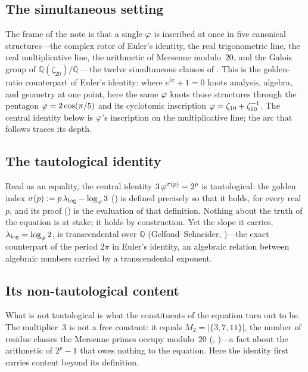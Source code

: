 \subsection*{The simultaneous setting}
The frame of the note is that a single $\varphi$ is inscribed at once in
five canonical structures---the complex rotor of Euler's identity, the real
trigonometric line, the real multiplicative line, the arithmetic of Mersenne
modulo~$20$, and the Galois group of $\mathbb{Q}(\zeta_{20})/\mathbb{Q}$%
---the twelve simultaneous clauses of .  This is
the golden-ratio counterpart of Euler's identity: where $e^{i\pi}+1=0$ knots
analysis, algebra, and geometry at one point, here the same $\varphi$ knots
those structures through the pentagon $\varphi=2\cos(\pi/5)$ and its
cyclotomic inscription $\varphi=\zeta_{10}+\zeta_{10}^{-1}$.  The central
identity below is $\varphi$'s inscription on the multiplicative line; the
arc that follows traces its depth.

\subsection*{The tautological identity}
Read as an equality, the central identity $3\,\varphi^{\sigma(p)}=2^{p}$ is
tautological: the golden index
$\sigma(p):=p\,\lambda_{\log}-\log_{\varphi}3$ () is defined
precisely so that it holds, for every real~$p$, and its proof
() is the evaluation of that definition.  Nothing about
the truth of the equation is at stake; it holds by construction.  Yet the
slope it carries, $\lambda_{\log}=\log_{\varphi}2$, is transcendental over
$\mathbb{Q}$ (Gelfond--Schneider, )---the exact
counterpart of the period $2\pi$ in Euler's identity, an algebraic relation
between algebraic numbers carried by a transcendental exponent.

\subsection*{Its non-tautological content}
What is not tautological is what the constituents of the equation turn out
to be.  The multiplier~$3$ is not a free constant: it equals
$M_{2}=|\{3,7,11\}|$, the number of residue classes the Mersenne primes
occupy modulo~$20$ (,
)---a fact about the arithmetic of $2^{p}-1$ that owes
nothing to the equation.  Here the identity first carries content beyond
its definition.

